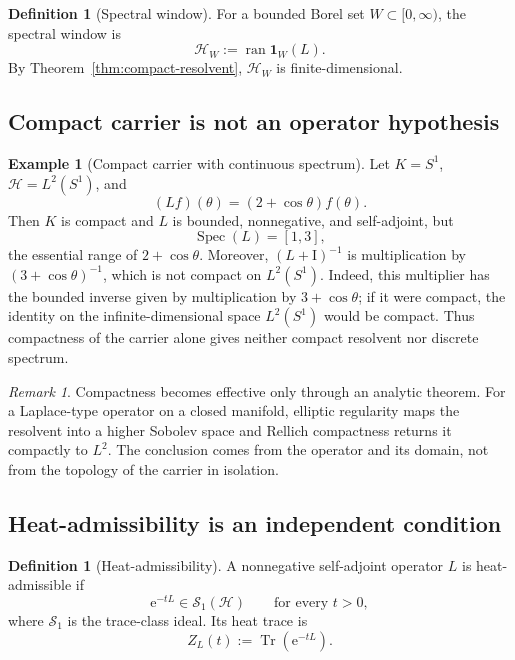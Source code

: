 \documentclass[11pt,a4paper]{article}
\theoremstyle{definition}
\newtheorem{definition}[theorem]{Definition}
\newtheorem{example}[theorem]{Example}
\theoremstyle{remark}
\newtheorem{remark}[theorem]{Remark}
\newcommand{\Hcal}{\mathcal H}
\newcommand{\Scal}{\mathcal S}
\newcommand{\Tr}{\operatorname{Tr}}
\newcommand{\Spec}{\operatorname{Spec}}
\newcommand{\ran}{\operatorname{ran}}
\newcommand{\Id}{\mathrm I}
\newcommand{\e}{\mathrm e}
\begin{document}
\begin{definition}[Spectral window]
For a bounded Borel set \(W\subset[0,\infty)\), the spectral window is
\[
  \Hcal_W:=\ran\mathbf 1_W(L).
\]
By Theorem~\ref{thm:compact-resolvent}, \(\Hcal_W\) is finite-dimensional.
\end{definition}

\subsection{Compact carrier is not an operator hypothesis}

\begin{example}[Compact carrier with continuous spectrum]
\label{ex:compact-carrier}
Let \(K=S^1\), \(\Hcal=L^2(S^1)\), and
\[
  (Lf)(\theta)=(2+\cos\theta)f(\theta).
\]
Then \(K\) is compact and \(L\) is bounded, nonnegative, and self-adjoint, but
\[
  \Spec(L)=[1,3],
\]
the essential range of \(2+\cos\theta\). Moreover,
\((L+\Id)^{-1}\) is multiplication by \((3+\cos\theta)^{-1}\), which is not
compact on \(L^2(S^1)\). Indeed, this multiplier has the bounded inverse given
by multiplication by \(3+\cos\theta\); if it were compact, the identity on the
infinite-dimensional space \(L^2(S^1)\) would be compact. Thus compactness of
the carrier alone gives neither compact resolvent nor discrete spectrum.
\end{example}

\begin{remark}
Compactness becomes effective only through an analytic theorem. For a
Laplace-type operator on a closed manifold, elliptic regularity maps the
resolvent into a higher Sobolev space and Rellich compactness returns it
compactly to \(L^2\). The conclusion comes from the operator and its domain,
not from the topology of the carrier in isolation.
\end{remark}

\subsection{Heat-admissibility is an independent condition}

\begin{definition}[Heat-admissibility]
A nonnegative self-adjoint operator \(L\) is heat-admissible if
\[
  \e^{-tL}\in\Scal_1(\Hcal)
  \qquad\text{for every }t>0,
\]
where \(\Scal_1\) is the trace-class ideal. Its heat trace is
\[
  Z_L(t):=\Tr(\e^{-tL}).
\]
\end{definition}
\end{document}
